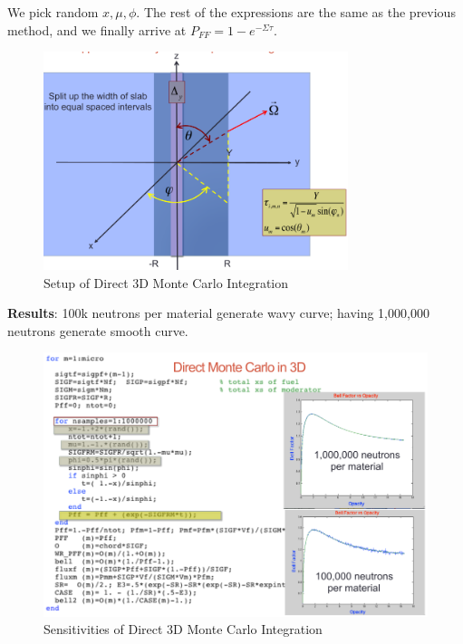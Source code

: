 \documentclass{school-22.211-notes}
\begin{document}
\clearpage
{}
We pick random $x, \mu, \phi$. The rest of the expressions are the same as the previous method, and we finally arrive at $P_{FF} = 1 - e^{-\Sigma \tau}$. 

\begin{figure}[h]
  \centering
  \includegraphics[width=3.5in]{images/pin/MC-integral-1.png}
  \caption{Setup of Direct 3D Monte Carlo Integration} 
\end{figure}

\textbf{Results}: 100k neutrons per material generate wavy curve; having 1,000,000 neutrons generate smooth curve. 
\begin{figure}[h]
  \centering
  \includegraphics[width=5.5in]{images/pin/MC-integral-2.png}
  \caption{Sensitivities of Direct 3D Monte Carlo Integration} 
\end{figure}
\end{document}
